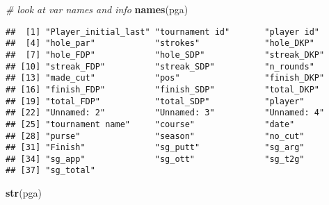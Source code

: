 \documentclass[
]{article}
\newenvironment{Shaded}{\begin{snugshade}}{\end{snugshade}}
\newcommand{\CommentTok}[1]{\textcolor[rgb]{0.56,0.35,0.01}{\textit{#1}}}
\newcommand{\KeywordTok}[1]{\textcolor[rgb]{0.13,0.29,0.53}{\textbf{#1}}}
\newcommand{\NormalTok}[1]{#1}
\begin{document}
\begin{Shaded}
\begin{Highlighting}[]
\CommentTok{# look at var names and info}
\KeywordTok{names}\NormalTok{(pga)}
\end{Highlighting}
\end{Shaded}

\begin{verbatim}
##  [1] "Player_initial_last" "tournament id"       "player id"          
##  [4] "hole_par"            "strokes"             "hole_DKP"           
##  [7] "hole_FDP"            "hole_SDP"            "streak_DKP"         
## [10] "streak_FDP"          "streak_SDP"          "n_rounds"           
## [13] "made_cut"            "pos"                 "finish_DKP"         
## [16] "finish_FDP"          "finish_SDP"          "total_DKP"          
## [19] "total_FDP"           "total_SDP"           "player"             
## [22] "Unnamed: 2"          "Unnamed: 3"          "Unnamed: 4"         
## [25] "tournament name"     "course"              "date"               
## [28] "purse"               "season"              "no_cut"             
## [31] "Finish"              "sg_putt"             "sg_arg"             
## [34] "sg_app"              "sg_ott"              "sg_t2g"             
## [37] "sg_total"
\end{verbatim}

\begin{Shaded}
\begin{Highlighting}[]
\KeywordTok{str}\NormalTok{(pga)}
\end{Highlighting}
\end{Shaded}
\end{document}
